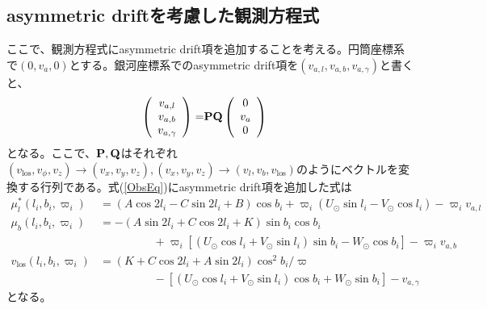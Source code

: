 \subsection{asymmetric driftを考慮した観測方程式}
ここで、観測方程式にasymmetric drift項を追加することを考える。円筒座標系で$(0,v_a,0)$とする。銀河座標系でのasymmetric drift項を$(v_{a,l},v_{a,b},v_{a,\gamma})$と書くと、
\begin{align}
\begin{aligned}
	\left(
	\begin{array}{c}
	 	v_{a,l}\\
		v_{a,b}\\
		v_{a,\gamma}
	\end{array}
	\right)
	=& \bf{P} \bf{Q}
	\left(
	\begin{array}{c}
	 	0\\
		v_a\\
		0
	\end{array}
	\right)
\end{aligned}
\end{align}
となる。ここで、$\bf{P,Q}$はそれぞれ$(v_{\mathrm{los}},v_{\phi},v_z) \to (v_x,v_ y,v_z), (v_x,v_y,v_z) \to (v_l,v_ b,v_{\mathrm{los}})$のようにベクトルを変換する行列である。式(\ref{ObsEq})にasymmetric drift項を追加した式は
\begin{subequations}
\begin{align}
	\mu^*_l(l_i,b_i,\varpi_i) &= (A\cos2l_i - C\sin2l_i + B)\cos b_i + \varpi_i(U_{\odot}\sin l_i - V_{\odot}\cos l_i) - \varpi_i v_{a,l} \\
	\mu_b(l_i,b_i,\varpi_i) &= -(A\sin2l_i + C\cos2l_i + K)\sin b_i \cos b_i \nonumber \\
	                          & \hspace{2cm} + \varpi_i[(U_{\odot}\cos l_i + V_{\odot} \sin l_i)\sin b_i - W_{\odot} \cos b_i] - \varpi_i v_{a,b} \\
	v_{\mathrm{los}}(l_i,b_i,\varpi_i) &= (K + C\cos2l_i + A\sin2l_i)\cos^2 b_i / \varpi \nonumber \\
	                      & \hspace{2cm} - [(U_{\odot}\cos l_i + V_{\odot} \sin l_i)\cos b_i + W_{\odot} \sin b_i] - v_{a,\gamma}
\end{align} \label{ObsEqAD}
\end{subequations}
となる。




